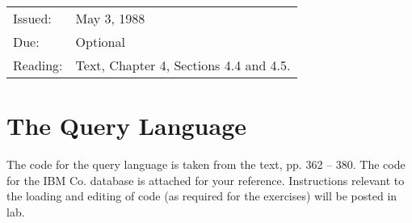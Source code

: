 % 
% 
% 
% 
% 
% 




\evensidemargin 35pt




\medskip

\begin{tabular}{ll}
Issued: & May 3, 1988 \\
Due: & Optional \\
Reading: & Text, Chapter 4, Sections 4.4 and 4.5.
\end{tabular}

\section{The Query Language}

The code for the query language is taken from the text, pp. 362 -- 380.  The
code for the IBM Co. database is attached for your reference.  Instructions
relevant to the loading and editing of code (as required for the exercises)
will be posted in lab.


